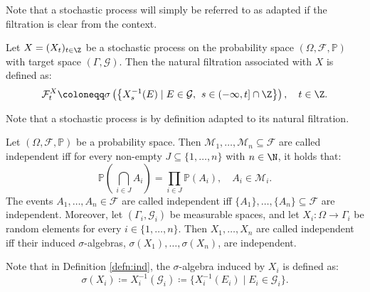 Note that a stochastic process will simply be referred to as adapted if the filtration is clear from the context.
\begin{defn}\label{defn:naturalfiltration}
Let $X=(X_{t})_{t\in\Z}$ be a stochastic process on the probability space $(\Omega,\mathcal{F},\mathbb{P})$ with target space $(\Gamma,\mathcal{G})$. Then the natural filtration associated with $X$ is defined as:
\begin{equation}
    \mathcal{F}_{t}^{X}\coloneqq\sigma\left(\left\{X_{s}^{-1}(E)\mid E\in\mathcal{G},\hspace{4pt} s\in(-\infty,t]\cap\Z\right\}\right),\quad t\in\Z.
\end{equation}
\end{defn}
Note that a stochastic process is by definition adapted to its natural filtration.
\begin{defn}\label{defn:ind}
Let $(\Omega,\mathcal{F},\mathbb{P})$ be a probability space. Then $\mathcal{M}_{1},\dots,\mathcal{M}_{n}\subseteq\mathcal{F}$ are called independent iff for every non-empty $J\subseteq\{1,\dots,n\}$ with $n\in\N$, it holds that:
\begin{equation}
    \mathbb{P}\left(\hspace{2pt}\bigcap\limits_{i\in J}A_{i}\right)=\prod_{i\in J}\mathbb{P}(A_{i}),\quad A_{i}\in\mathcal{M}_{i}.
\end{equation}
The events $A_{1},\dots,A_{n}\in\mathcal{F}$ are called independent iff $\{A_{1}\},\dots,\{A_{n}\}\subseteq\mathcal{F}$ are independent. Moreover, let $(\Gamma_{i},\mathcal{G}_{i})$ be measurable spaces, and let $X_{i}:\Omega\to\Gamma_{i}$ be random elements for every $i\in\{1,\dots,n\}$. Then $X_{1},\dots,X_{n}$ are called independent iff their induced $\sigma$-algebras, $\sigma(X_{1}),\dots,\sigma(X_{n})$, are independent.
\end{defn}
Note that in Definition \ref{defn:ind}, the $\sigma$-algebra induced by $X_{i}$ is defined as:
\begin{equation}
    \sigma(X_{i})\coloneqq X_{i}^{-1}(\mathcal{G}_{i})\coloneqq\{X_{i}^{-1}(E_{i})\mid E_{i}\in\mathcal{G}_{i}\}.
\end{equation}
